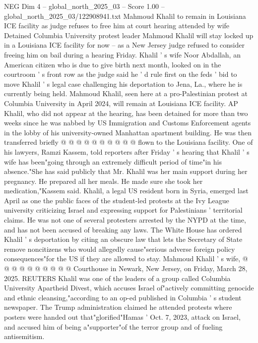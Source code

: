 \begin{textsample}{NEG Dim 4 – global\_north\_2025\_03 – Score 1.00 – global\_north\_2025\_03/122908941.txt}  \label{ex:f4_neg_398}
Mahmoud Khalil to remain in Louisiana ICE facility as judge refuses to free him at court hearing attended by wife Detained Columbia University protest leader Mahmoud Khalil will stay locked up in a Louisiana ICE facility for now -- as a New Jersey judge refused to consider freeing him on bail during a hearing Friday.
Khalil ' s wife Noor Abdallah, an American citizen who is due to give birth next month, looked on in the courtroom ' s front row as the judge said he ' d rule first on the feds ' bid to move Khalil ' s legal case challenging his deportation to Jena, La., where he is currently being held.
Mahmoud Khalil, seen here at a pro-Palestinian protest at Columbia University in April 2024, will remain at Louisiana ICE facility.
AP Khalil, who did not appear at the hearing, has been detained for more than two weeks since he was nabbed by US Immigration and Customs Enforcement agents in the lobby of his university-owned Manhattan apartment building.
He was then transferred briefly @ @ @ @ @ @ @ @ @ @ flown to the Louisiana facility.
One of his lawyers, Ramzi Kassem, told reporters after Friday ' s hearing that Khalil ' s wife has been"going through an extremely difficult period of time"in his absence."She has said publicly that Mr.
Khalil was her main support during her pregnancy.
He prepared all her meals.
He made sure she took her medication,"Kassem said.
Khalil, a legal US resident born in Syria, emerged last April as one the public faces of the student-led protests at the Ivy League university criticizing Israel and expressing support for Palestinians ' territorial claims.
He was not one of several protesters arrested by the NYPD at the time, and has not been accused of breaking any laws.
The White House has ordered Khalil ' s deportation by citing an obscure law that lets the Secretary of State remove noncitizens who would allegedly cause"serious adverse foreign policy consequences"for the US if they are allowed to stay.
Mahmoud Khalil ' s wife, @ @ @ @ @ @ @ @ @ @ Courthouse in Newark, New Jersey, on Friday, March 28, 2025.
REUTERS Khalil was one of the leaders of a group called Columbia University Apartheid Divest, which accuses Israel of"actively committing genocide and ethnic cleansing,"according to an op-ed published in Columbia ' s student newspaper.
The Trump administration claimed he attended protests where posters were handed out that"glorified"Hamas ' Oct. 7, 2023, attack on Israel, and accused him of being a"supporter"of the terror group and of fueling antisemitism.

\end{textsample}
